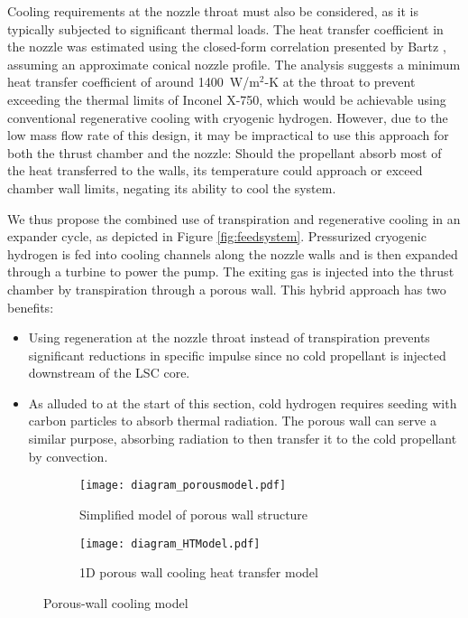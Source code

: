 \documentclass[final,3p,times,twocolumn,sort&compress, lefttitle]{elsarticle}
\begin{document}
                Cooling requirements at the nozzle throat must also be considered, as it is typically subjected to significant thermal loads. The heat transfer coefficient in the nozzle was estimated using the closed-form correlation presented by Bartz \cite{bartz_turbulent_1965}, assuming an approximate conical nozzle profile. The analysis suggests a minimum heat transfer coefficient of around 1400~W/m$^2$-K at the throat to prevent exceeding the thermal limits of Inconel X-750, which would be achievable using conventional regenerative cooling with cryogenic hydrogen. However, due to the low mass flow rate of this design, it may be impractical to use this approach for both the thrust chamber and the nozzle: Should the propellant absorb most of the heat transferred to the walls, its temperature could approach or exceed chamber wall limits, negating its ability to cool the system.
                
                We thus propose the combined use of transpiration and regenerative cooling in an expander cycle, as depicted in Figure \ref{fig:feedsystem}. Pressurized cryogenic hydrogen is fed into cooling channels along the nozzle walls and is then expanded through a turbine to power the pump. The exiting gas is injected into the thrust chamber by transpiration through a porous wall. This hybrid approach has two benefits:
                \begin{itemize}[\textemdash]
                    \item Using regeneration at the nozzle throat instead of transpiration prevents significant reductions in specific impulse since no cold propellant is injected downstream of the LSC core.
                    \item As alluded to at the start of this section, cold hydrogen requires seeding with carbon particles to absorb thermal radiation. The porous wall can serve a similar purpose, absorbing radiation to then transfer it to the cold propellant by convection.
                \end{itemize}
                
                \begin{figure}[t]
                    \centering
                    \begin{subfigure}[b]{\columnwidth}
                        \centering
                        \texttt{[image: diagram\_porousmodel.pdf]}
                        \caption{Simplified model of porous wall structure}
                        \label{fig:ht_porous}
                    \end{subfigure}
                    \begin{subfigure}[b]{\columnwidth}
                        \centering
                        \texttt{[image: diagram\_HTModel.pdf]}
                        \caption{1D porous wall cooling heat transfer model}
                        \label{fig:ht_model}
                    \end{subfigure}
                    \caption{Porous-wall cooling model}
                    \label{fig:ht}
                \end{figure}
                
\end{document}
